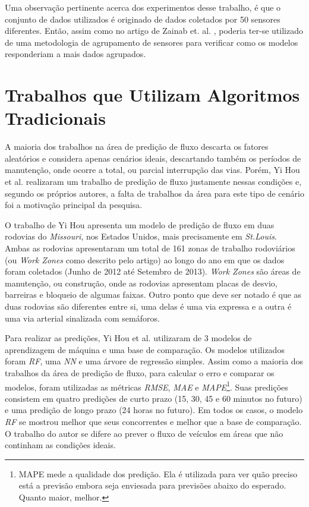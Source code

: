 Uma observação pertinente acerca dos experimentos desse trabalho, é que o conjunto de dados utilizados é originado de dados coletados por 50 sensores diferentes. Então, assim como no artigo de Zainab et. al. \cite{Zainab_2018}, poderia ter-se utilizado de uma metodologia de agrupamento de sensores para verificar como os modelos responderiam a mais dados agrupados.

\section{Trabalhos que Utilizam Algoritmos Tradicionais}

A maioria dos trabalhos na área de predição de fluxo descarta os fatores aleatórios e considera apenas cenários ideais, descartando também os períodos de manutenção, onde ocorre a total, ou parcial interrupção das vias. Porém, Yi Hou et al. \cite{hou2014traffic} realizaram um trabalho de predição de fluxo justamente nessas condições e, segundo os próprios autores, a falta de trabalhos da área para este tipo de cenário foi a motivação principal da pesquisa. 

O trabalho de Yi Hou apresenta um modelo de predição de fluxo em duas rodovias do \textit{Missouri}, nos Estados Unidos, mais precisamente em \textit{St.Louis}. Ambas as rodovias apresentaram um total de 161 zonas de trabalho rodoviários (ou \textit{Work Zones} como descrito pelo artigo) ao longo do ano em que os dados foram coletados (Junho de 2012 até Setembro de 2013). \textit{Work Zones} são áreas de manutenção, ou construção, onde as rodovias apresentam placas de desvio, barreiras e bloqueio de algumas faixas. Outro ponto que deve ser notado é que as duas rodovias são diferentes entre si, uma delas é uma via expressa e a outra é uma via arterial sinalizada com semáforos.

Para realizar as predições, Yi Hou et al. utilizaram de 3 modelos de aprendizagem de máquina e uma base de comparação. Os modelos utilizados foram \textit{\acrshort{RF}}, uma \textit{\acrfull{NN}} e uma árvore de regressão simples. Assim como a maioria dos trabalhos da área de predição de fluxo, para calcular o erro e comparar os modelos, foram utilizadas as métricas \textit{\acrshort{RMSE}}, \textit{\acrshort{MAE}} e \textit{\acrfull{MAPE}}\footnote{MAPE mede a qualidade dos predição. Ela é utilizada para ver quão preciso está a previsão embora seja enviesada para previsões abaixo do esperado. Quanto maior, melhor.}. Suas predições consistem em quatro predições de curto prazo (15, 30, 45 e 60 minutos no futuro) e uma predição de longo prazo (24 horas no futuro). Em todos os casos, o modelo \textit{\acrshort{RF}} se mostrou melhor que seus concorrentes e melhor que a base de comparação. O trabalho do autor se difere ao prever o fluxo de veículos em áreas que não continham as condições ideais.


